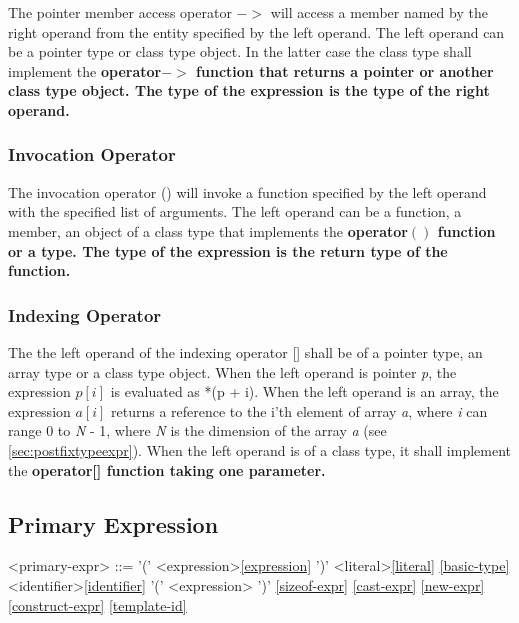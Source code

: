 \documentclass[a4paper,oneside,11pt]{article}
\begin{document}
The pointer member access operator $->$ will access a member named by the right operand from the entity specified by the left operand.
The left operand can be a pointer type or class type object. In the latter case the class type shall implement the \bf{operator$->$}
function that returns a pointer or another class type object. The type of the expression is the type of the right operand.

\subsubsection{Invocation Operator}\label{invocation}

The invocation operator () will invoke a function specified by the left operand with the specified list of arguments.
The left operand can be a function, a member, an object of a class type that implements the \bf{operator$()$} function or a type.
The type of the expression is the return type of the function.

\subsubsection{Indexing Operator}\label{indexing}

The the left operand of the indexing operator [] shall be of a pointer type, an array type or a class type object.
When the left operand is pointer \emph{p}, the expression $p[i]$ is evaluated as *(p + i).
When the left operand is an array, the expression $a[i]$ returns a reference to the i'th element of array \emph{a},
where \emph{i} can range 0 to \emph{N} - 1, where \emph{N} is the dimension of the array \emph{a} (see \ref{sec:postfixtypeexpr}).
When the left operand is of a class type, it shall implement the \bf{operator[]} function taking one parameter.

\subsection{Primary Expression}

\begin{grammar}
\label{primary-expr}<primary-expr> ::= '(' <expression>\ref{expression} ')'
\alt <literal>\ref{literal}
\ref{basic-type}
\alt <identifier>\ref{identifier}
\alt {} '(' <expression> ')'
\alt {}
\alt {}
\ref{sizeof-expr}
\ref{cast-expr}
\ref{new-expr}
\ref{construct-expr}
\ref{template-id}
\end{grammar}
\end{document}
